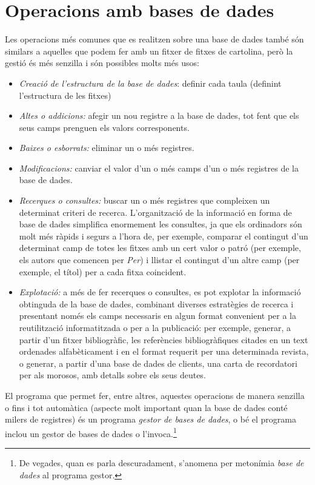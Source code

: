 \section{Operacions amb bases de dades}

Les operacions més comunes que es realitzen sobre una base de dades
també són similars a aquelles que podem fer amb un fitxer de fitxes de
cartolina, però la gestió és més senzilla i són possibles molts més usos:
\begin{itemize}
\item \emph{Creació de l'estructura de la base de dades}: definir cada taula (definint
  l'estructura de les fitxes)
\item \emph{Altes o addicions:} afegir un nou registre a la base de dades,
  tot fent que els seus camps prenguen els valors corresponents.
\item \emph{Baixes o esborrats:} eliminar un o més registres.
\item \emph{Modificacions:} canviar el valor d'un o més camps d'un o
  més registres de la base de dades.
\item \emph{Recerques o consultes:} buscar un o més registres que
  compleixen un determinat criteri de recerca. L'organització de la
  informació en forma de base de dades simplifica enormement les
  consultes, ja que els ordinadors són molt més ràpids i segurs a
  l'hora de, per exemple, comparar el contingut d'un determinat camp
  de totes les fitxes amb un cert valor o patró (per exemple, els
  autors que comencen per \emph{Per}) i llistar el contingut d'un
  altre camp (per exemple, el títol) per a cada fitxa coincident.
\item \emph{Explotació:} a més de fer recerques o consultes, es pot
  explotar la informació obtinguda de la base de dades, combinant
  diverses estratègies de recerca i presentant només els camps
  necessaris en algun format convenient per a la reutilització
  informatitzada o per a la publicació: per exemple, generar, a partir
  d'un fitxer bibliogràfic, les referències bibliogràfiques citades en
  un text ordenades alfabèticament i en el format requerit per una
  determinada revista, o generar, a partir d'una base de dades de
  clients, una carta de recordatori per als morosos, amb detalls sobre
  els seus deutes.
\end{itemize}
El programa que permet fer, entre altres, aquestes operacions de
manera senzilla o fins i tot automàtica (aspecte molt important quan
la base de dades conté milers de registres) és un programa
\emph{gestor de bases de dades}, o bé el programa inclou un gestor de
bases de dades o l'invoca.\footnote{De vegades, quan es parla
  descuradament, s'anomena per metonímia \emph{base de dades} al
  programa gestor.}


